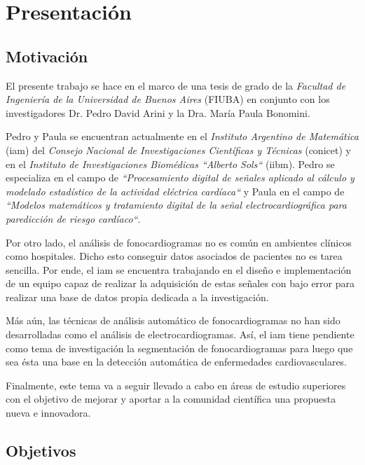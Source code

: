 \chapter{Presentación}

\section{Motivación}

\indent El presente trabajo se hace en el marco de una tesis de grado de la \textit{Facultad de Ingeniería de la Universidad de Buenos Aires} (FIUBA) en conjunto con los investigadores Dr. Pedro David Arini y la Dra. María Paula Bonomini. \bigskip

\indent Pedro y Paula se encuentran actualmente en el \textit{Instituto Argentino de Matemática} (\acrshort{iam}) del \textit{Consejo Nacional de Investigaciones Científicas y Técnicas} (\acrshort{conicet}) y en el \textit{Instituto de Investigaciones Biomédicas ``Alberto Sols``} (\acrshort{iibm}). Pedro se especializa en el campo de \textit{``Procesamiento digital de señales aplicado al cálculo y modelado estadístico de la actividad eléctrica cardíaca``} y Paula en el campo de \textit{``Modelos matemáticos y tratamiento digital de la señal electrocardiográfica para paredicción de riesgo cardíaco``}. \bigskip

\indent Por otro lado, el análisis de fonocardiogramas no es común en
ambientes clínicos como hospitales. Dicho esto conseguir datos asociados de pacientes no es tarea sencilla. Por ende, el \acrshort{iam} se encuentra trabajando en el diseño e implementación de un equipo capaz de realizar la adquisición de estas señales con bajo error para realizar una base de datos propia dedicada a la investigación.

\indent Más aún, las técnicas de análisis automático de fonocardiogramas no han sido desarrolladas como el análisis de electrocardiogramas. Así, el \acrshort{iam} tiene pendiente como tema de investigación la segmentación de fonocardiogramas para luego que sea ésta una base en la detección automática de enfermedades cardiovasculares. \bigskip

\indent Finalmente, este tema va a seguir llevado a cabo en áreas de estudio superiores con el objetivo de mejorar y aportar a la comunidad científica una propuesta nueva e innovadora.

\newpage

\section{Objetivos}

